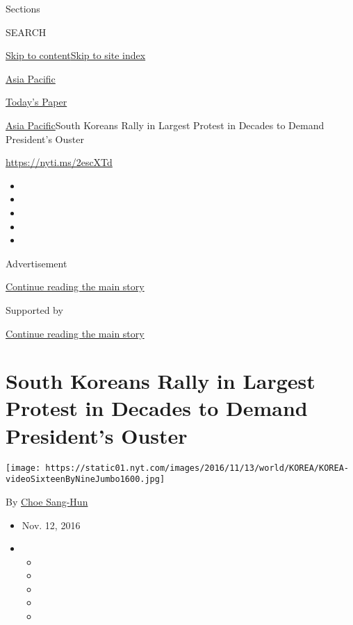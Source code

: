 Sections

SEARCH

\protect\hyperlink{site-content}{Skip to
content}\protect\hyperlink{site-index}{Skip to site index}

\href{https://www.nytimes.com/section/world/asia}{Asia Pacific}

\href{https://myaccount.nytimes.com/auth/login?response_type=cookie\&client_id=vi}{}

\href{https://www.nytimes.com/section/todayspaper}{Today's Paper}

\href{/section/world/asia}{Asia Pacific}\textbar{}South Koreans Rally in
Largest Protest in Decades to Demand President's Ouster

\url{https://nyti.ms/2escXTd}

\begin{itemize}
\item
\item
\item
\item
\item
\end{itemize}

Advertisement

\protect\hyperlink{after-top}{Continue reading the main story}

Supported by

\protect\hyperlink{after-sponsor}{Continue reading the main story}

\hypertarget{south-koreans-rally-in-largest-protest-in-decades-to-demand-presidents-ouster}{%
\section{South Koreans Rally in Largest Protest in Decades to Demand
President's
Ouster}\label{south-koreans-rally-in-largest-protest-in-decades-to-demand-presidents-ouster}}

\texttt{[image: https://static01.nyt.com/images/2016/11/13/world/KOREA/KOREA-videoSixteenByNineJumbo1600.jpg]}

By \href{http://www.nytimes.com/by/choe-sang-hun}{Choe Sang-Hun}

\begin{itemize}
\item
  Nov. 12, 2016
\item
  \begin{itemize}
  \item
  \item
  \item
  \item
  \item
  \end{itemize}
\end{itemize}

